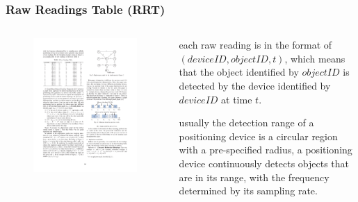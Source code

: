
\begin{frame}
\frametitle{Raw Readings Table (RRT)}

\begin{columns}[c]

  \begin{figure}[tb]
    \includegraphics[width=\columnwidth]{figures/3-2/3-2-2.pdf}
  \end{figure}

  \begin{sitemize}
    \item each raw reading is in the format of $(deviceID, objectID, t)$, which means that the object identified by $objectID$ is detected by the device identified by $deviceID$ at time $t$.
    \item usually the detection range of a positioning device is a circular region with a pre-specified radius, a positioning device continuously detects objects that are in its range, with the frequency determined by its sampling rate.
  \end{sitemize}

\end{columns}

\end{frame}

